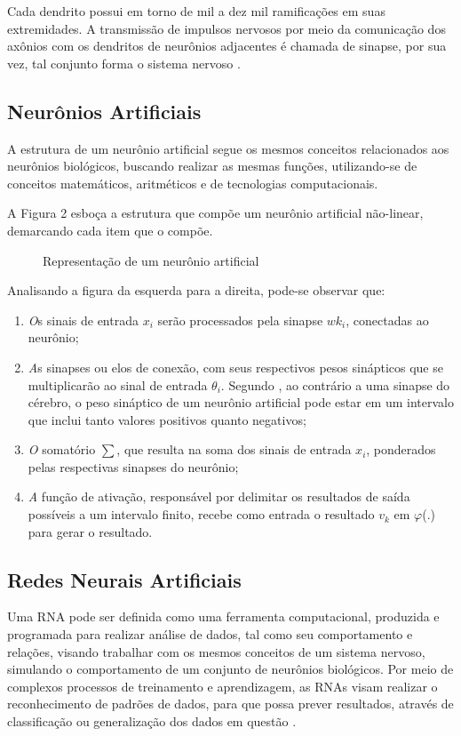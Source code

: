 Cada dendrito possui em torno de mil a dez mil ramificações em suas extremidades. A transmissão de impulsos nervosos por meio da comunicação dos axônios com os dendritos de neurônios adjacentes é chamada de sinapse, por sua vez, tal conjunto forma o sistema nervoso \cite{neto}.

\subsection{Neurônios Artificiais}
A estrutura de um neurônio artificial segue os mesmos conceitos relacionados aos neurônios biológicos, buscando realizar as mesmas funções, utilizando-se de conceitos matemáticos, aritméticos e de tecnologias computacionais.

A Figura 2 esboça a estrutura que compõe um neurônio artificial não-linear, demarcando cada item que o compõe. 

\begin{figure}[h]
	\centering
	\caption{Representação de um neurônio artificial}
	\label{exec-linearmente-separavel}
\end{figure}

Analisando a figura da esquerda para a direita, pode-se observar que: 

\begin{enumerate}
	\item \textit Os sinais de entrada $x_i$ serão processados pela sinapse $wk_i$, conectadas ao neurônio;
	\item \textit As sinapses ou elos de conexão, com seus respectivos pesos sinápticos que se multiplicarão ao sinal de entrada $\theta_i$. Segundo , ao contrário a uma sinapse do cérebro, o peso sináptico de um neurônio artificial pode estar em um intervalo que inclui tanto valores positivos quanto negativos;
	\item \textit O somatório $\sum$, que resulta na soma dos sinais de entrada $x_i$, ponderados pelas respectivas sinapses do neurônio;
	\item \textit A função de ativação, responsável por delimitar os resultados de saída possíveis a um intervalo finito, recebe como entrada o resultado $v_k$ em $\varphi$(.) para gerar o resultado.
\end{enumerate}

\subsection{Redes Neurais Artificiais}\label{sec:redes-neurais}
Uma RNA pode ser definida como uma ferramenta computacional, produzida e programada para realizar análise de dados, tal como seu comportamento e relações, visando trabalhar com os mesmos conceitos de um sistema nervoso, simulando o comportamento de um conjunto de neurônios biológicos. Por meio de complexos processos de treinamento e aprendizagem, as RNAs visam realizar o reconhecimento de padrões de dados, para que possa prever resultados, através de classificação ou generalização dos dados em questão \cite{haykin2009}.

